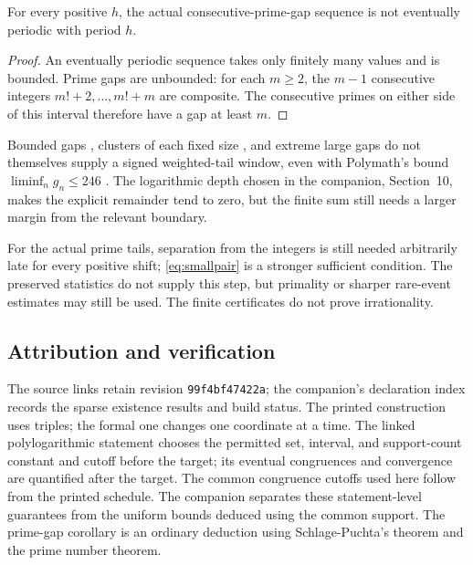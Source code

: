\documentclass[11pt]{article}
\begin{document}
\begin{proposition}\label{res:gap-nonperiodic}
For every positive $h$, the actual consecutive-prime-gap sequence is not
eventually periodic with period $h$.
\end{proposition}
\begin{proof}
An eventually periodic sequence takes only finitely many values and is
bounded.  Prime gaps are unbounded: for each $m\ge2$, the $m-1$ consecutive
integers $m!+2,\ldots,m!+m$ are composite.  The consecutive primes on
either side of this interval therefore have a gap at least $m$.
\end{proof}

Bounded gaps \cite{zhang2014}, clusters of each fixed size
\cite{maynard2015,polymath2014}, and extreme large gaps
\cite{fgkmt2018} do not themselves supply a signed weighted-tail window,
even with Polymath's bound $\liminf_n g_n\le246$
\cite[Theorem~1.4(i)]{polymath2014}.  The logarithmic depth chosen in the
companion, Section~10, makes the explicit remainder tend to zero, but the
finite sum still needs a larger margin from the relevant boundary.

For the actual prime tails, separation from the integers is still needed
arbitrarily late for every positive shift; \eqref{eq:smallpair} is a
stronger sufficient condition.  The preserved statistics do not supply
this step, but primality or sharper rare-event estimates may still be used.
The finite certificates do not prove irrationality.

\subsection*{Attribution and verification}
The source links retain revision \texttt{99f4bf47422a}; the companion's
declaration index records the sparse existence results and build status.
The printed construction uses triples; the formal one changes one
coordinate at a time.  The linked polylogarithmic statement chooses the
permitted set, interval, and support-count constant and cutoff before the
target; its eventual congruences and convergence are quantified after the
target.  The common congruence cutoffs used here follow from the printed
schedule.  The companion separates these statement-level guarantees from
the uniform bounds deduced using the common support.
The prime-gap corollary is an ordinary deduction using Schlage-Puchta's
theorem and the prime number theorem.
\end{document}
